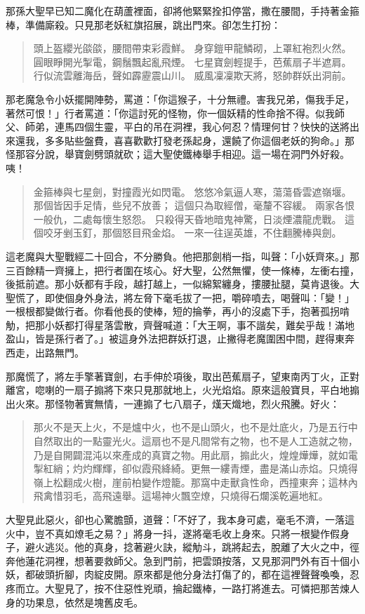 那孫大聖早已知二魔化在葫蘆裡面，卻將他緊緊拴扣停當，撒在腰間，手持著金箍棒，準備廝殺。只見那老妖紅旗招展，跳出門來。卻怎生打扮：
\begin{quote}
頭上盔纓光燄燄，腰間帶束彩霞鮮。
身穿鎧甲龍鱗砌，上罩紅袍烈火然。
圓眼睜開光掣電，鋼鬚飄起亂飛煙。
七星寶劍輕提手，芭蕉扇子半遮肩。
行似流雲離海岳，聲如霹靂震山川。
威風凜凜欺天將，怒帥群妖出洞前。
\end{quote}

那老魔急令小妖擺開陣勢，罵道：「你這猴子，十分無禮。害我兄弟，傷我手足，著然可恨！」行者罵道：「你這討死的怪物，你一個妖精的性命捨不得。似我師父、師弟，連馬四個生靈，平白的吊在洞裡，我心何忍？情理何甘？快快的送將出來還我，多多貼些盤費，喜喜歡歡打發老孫起身，還饒了你這個老妖的狗命。」那怪那容分說，舉寶劍劈頭就砍；這大聖使鐵棒舉手相迎。這一場在洞門外好殺。咦！
\begin{quote}
金箍棒與七星劍，對撞霞光如閃電。
悠悠冷氣逼人寒，蕩蕩昏雲遮嶺堰。
那個皆因手足情，些兒不放善；
這個只為取經僧，毫釐不容緩。
兩家各恨一般仇，二處每懷生怒怨。
只殺得天昏地暗鬼神驚，日淡煙濃龍虎戰。
這個咬牙剉玉釘，那個怒目飛金焰。
一來一往逞英雄，不住翻騰棒與劍。
\end{quote}

這老魔與大聖戰經二十回合，不分勝負。他把那劍梢一指，叫聲：「小妖齊來。」那三百餘精一齊擁上，把行者圍在垓心。好大聖，公然無懼，使一條棒，左衝右撞，後抵前遮。那小妖都有手段，越打越上，一似綿絮纏身，摟腰扯腿，莫肯退後。大聖慌了，即使個身外身法，將左脅下毫毛拔了一把，嚼碎噴去，喝聲叫：「變！」一根根都變做行者。你看他長的使棒，短的掄拳，再小的沒處下手，抱著孤拐啃觔，把那小妖都打得星落雲散，齊聲喊道：「大王啊，事不諧矣，難矣乎哉！滿地盈山，皆是孫行者了。」被這身外法把群妖打退，止撇得老魔圍困中間，趕得東奔西走，出路無門。

那魔慌了，將左手擎著寶劍，右手伸於項後，取出芭蕉扇子，望東南丙丁火，正對離宮，唿喇的一扇子搧將下來只見那就地上，火光焰焰。原來這般寶貝，平白地搧出火來。那怪物著實無情，一連搧了七八扇子，熯天熾地，烈火飛騰。好火：
\begin{quote}
那火不是天上火，不是爐中火，也不是山頭火，也不是灶底火，乃是五行中自然取出的一點靈光火。這扇也不是凡間常有之物，也不是人工造就之物，乃是自開闢混沌以來產成的真寶之物。用此扇，搧此火，煌煌燁燁，就如電掣紅綃；灼灼輝輝，卻似霞飛絳綺。更無一縷青煙，盡是滿山赤焰。只燒得嶺上松翻成火樹，崖前柏變作燈籠。那窩中走獸貪性命，西撞東奔；這林內飛禽惜羽毛，高飛遠舉。這場神火飄空燎，只燒得石爛溪乾遍地紅。
\end{quote}

大聖見此惡火，卻也心驚膽顫，道聲：「不好了，我本身可處，毫毛不濟，一落這火中，豈不真如燎毛之易？」將身一抖，遂將毫毛收上身來。只將一根變作假身子，避火逃災。他的真身，捻著避火訣，縱觔斗，跳將起去，脫離了大火之中，徑奔他蓮花洞裡，想著要救師父。急到門前，把雲頭按落，又見那洞門外有百十個小妖，都破頭折腳，肉綻皮開。原來都是他分身法打傷了的，都在這裡聲聲喚喚，忍疼而立。大聖見了，按不住惡性兇頑，掄起鐵棒，一路打將進去。可憐把那苦煉人身的功果息，依然是塊舊皮毛。

